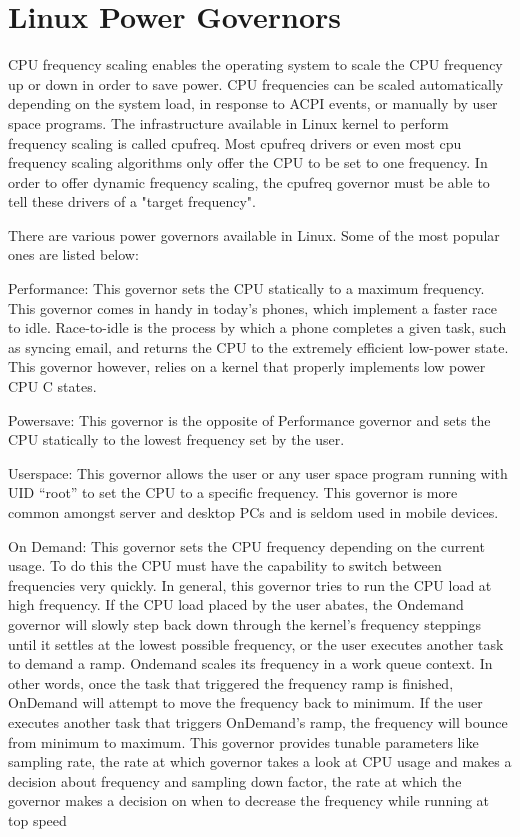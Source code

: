 \section{Linux Power Governors}\label{sec:linux-powergov}


CPU frequency scaling enables the operating system to scale the CPU frequency up or down in order to save power. CPU frequencies can be scaled automatically depending on the system load, in response to ACPI events, or manually by user space programs. The infrastructure available in Linux kernel to perform frequency scaling is called cpufreq. Most cpufreq drivers or even most cpu frequency scaling algorithms only offer the CPU to be set to one frequency. In order to offer dynamic frequency scaling, the cpufreq governor must be able to tell these drivers of a "target frequency".

There are various power governors available in Linux. Some of the most popular ones are listed below:

Performance:
This governor sets the CPU statically to a maximum frequency. This governor comes in handy in today’s phones, which implement a faster race to idle. Race-to-idle is the process by which a phone completes a given task, such as syncing email, and returns the CPU to the extremely efficient low-power state. This governor however, relies on a kernel that properly implements low power CPU C states.

Powersave:
This governor is the opposite of Performance governor and sets the CPU statically to the lowest frequency set by the user.

Userspace:
This governor allows the user or any user space program running with UID “root” to set the CPU to a specific frequency. This governor is more common amongst server and desktop PCs and is seldom used in mobile devices.

On Demand:
This governor sets the CPU frequency depending on the current usage. To do this the CPU must have the capability to switch between frequencies very quickly. In general, this governor tries to run the CPU load at high frequency. If the CPU load placed by the user abates, the Ondemand governor will slowly step back down through the kernel's frequency steppings until it settles at the lowest possible frequency, or the user executes another task to demand a ramp.
Ondemand scales its frequency in a work queue context. In other words, once the task that triggered the frequency ramp is finished, OnDemand will attempt to move the frequency back to minimum. If the user executes another task that triggers OnDemand's ramp, the frequency will bounce from minimum to maximum.
This governor provides tunable parameters like sampling rate, the rate at which governor takes a look at CPU usage and makes a decision about frequency and sampling down factor, the rate at which the governor makes a decision on when to decrease the frequency while running at top speed



